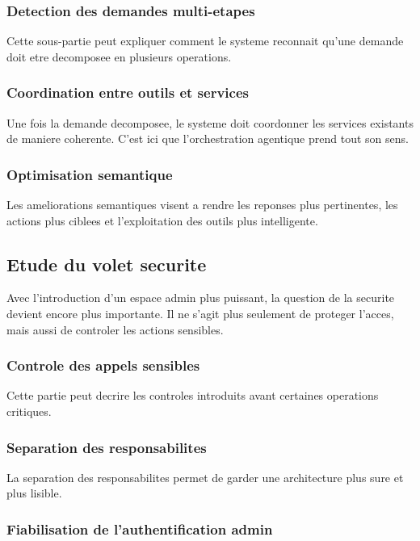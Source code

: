\subsubsection{Detection des demandes multi-etapes}

Cette sous-partie peut expliquer comment le systeme reconnait qu'une demande doit etre decomposee en plusieurs operations.

\subsubsection{Coordination entre outils et services}

Une fois la demande decomposee, le systeme doit coordonner les services existants de maniere coherente. C'est ici que l'orchestration agentique prend tout son sens.

\subsubsection{Optimisation semantique}

Les ameliorations semantiques visent a rendre les reponses plus pertinentes, les actions plus ciblees et l'exploitation des outils plus intelligente.

\subsection{Etude du volet securite}

Avec l'introduction d'un espace admin plus puissant, la question de la securite devient encore plus importante. Il ne s'agit plus seulement de proteger l'acces, mais aussi de controler les actions sensibles.

\subsubsection{Controle des appels sensibles}

Cette partie peut decrire les controles introduits avant certaines operations critiques.

\subsubsection{Separation des responsabilites}

La separation des responsabilites permet de garder une architecture plus sure et plus lisible.

\subsubsection{Fiabilisation de l'authentification admin}

